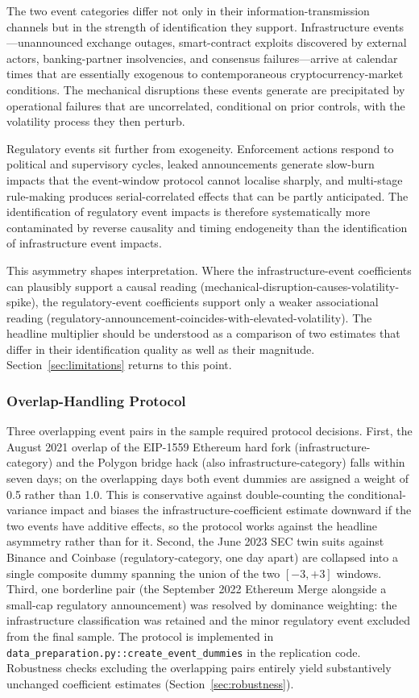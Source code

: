 \documentclass[pdflatex,sn-mathphys-num]{sn-jnl}
\theoremstyle{thmstyleone}
\theoremstyle{thmstyletwo}
\theoremstyle{thmstylethree}
\begin{document}
The two event categories differ not only in their information-transmission channels but in the strength of identification they support. Infrastructure events---unannounced exchange outages, smart-contract exploits discovered by external actors, banking-partner insolvencies, and consensus failures---arrive at calendar times that are essentially exogenous to contemporaneous cryptocurrency-market conditions. The mechanical disruptions these events generate are precipitated by operational failures that are uncorrelated, conditional on prior controls, with the volatility process they then perturb.

Regulatory events sit further from exogeneity. Enforcement actions respond to political and supervisory cycles, leaked announcements generate slow-burn impacts that the event-window protocol cannot localise sharply, and multi-stage rule-making produces serial-correlated effects that can be partly anticipated. The identification of regulatory event impacts is therefore systematically more contaminated by reverse causality and timing endogeneity than the identification of infrastructure event impacts.

This asymmetry shapes interpretation. Where the infrastructure-event coefficients can plausibly support a causal reading (mechanical-disruption-causes-volatility-spike), the regulatory-event coefficients support only a weaker associational reading (regulatory-announcement-coincides-with-elevated-volatility). The headline multiplier should be understood as a comparison of two estimates that differ in their identification quality as well as their magnitude. Section~\ref{sec:limitations} returns to this point.

\subsubsection{Overlap-Handling Protocol}

Three overlapping event pairs in the sample required protocol decisions. First, the August 2021 overlap of the EIP-1559 Ethereum hard fork (infrastructure-category) and the Polygon bridge hack (also infrastructure-category) falls within seven days; on the overlapping days both event dummies are assigned a weight of 0.5 rather than 1.0. This is conservative against double-counting the conditional-variance impact and biases the infrastructure-coefficient estimate downward if the two events have additive effects, so the protocol works against the headline asymmetry rather than for it. Second, the June 2023 SEC twin suits against Binance and Coinbase (regulatory-category, one day apart) are collapsed into a single composite dummy spanning the union of the two $[-3,+3]$ windows. Third, one borderline pair (the September 2022 Ethereum Merge alongside a small-cap regulatory announcement) was resolved by dominance weighting: the infrastructure classification was retained and the minor regulatory event excluded from the final sample. The protocol is implemented in \texttt{data\_preparation.py::create\_event\_dummies} in the replication code. Robustness checks excluding the overlapping pairs entirely yield substantively unchanged coefficient estimates (Section~\ref{sec:robustness}).
\end{document}
